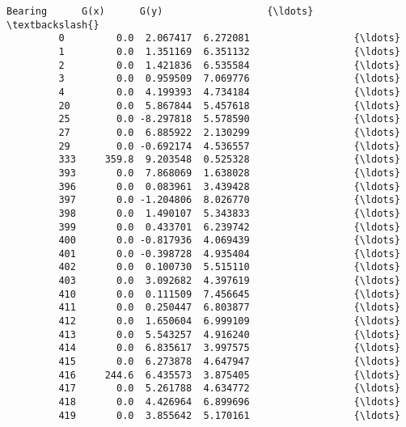 \documentclass[11pt]{article}
\begin{document}
\begin{Verbatim}[commandchars=\\\{\}]
               Bearing      G(x)      G(y)                  {\ldots}                   \textbackslash{}
         0         0.0  2.067417  6.272081                  {\ldots}                    
         1         0.0  1.351169  6.351132                  {\ldots}                    
         2         0.0  1.421836  6.535584                  {\ldots}                    
         3         0.0  0.959509  7.069776                  {\ldots}                    
         4         0.0  4.199393  4.734184                  {\ldots}                    
         20        0.0  5.867844  5.457618                  {\ldots}                    
         25        0.0 -8.297818  5.578590                  {\ldots}                    
         27        0.0  6.885922  2.130299                  {\ldots}                    
         29        0.0 -0.692174  4.536557                  {\ldots}                    
         333     359.8  9.203548  0.525328                  {\ldots}                    
         393       0.0  7.868069  1.638028                  {\ldots}                    
         396       0.0  0.083961  3.439428                  {\ldots}                    
         397       0.0 -1.204806  8.026770                  {\ldots}                    
         398       0.0  1.490107  5.343833                  {\ldots}                    
         399       0.0  0.433701  6.239742                  {\ldots}                    
         400       0.0 -0.817936  4.069439                  {\ldots}                    
         401       0.0 -0.398728  4.935404                  {\ldots}                    
         402       0.0  0.100730  5.515110                  {\ldots}                    
         403       0.0  3.092682  4.397619                  {\ldots}                    
         410       0.0  0.111509  7.456645                  {\ldots}                    
         411       0.0  0.250447  6.803877                  {\ldots}                    
         412       0.0  1.650604  6.999109                  {\ldots}                    
         413       0.0  5.543257  4.916240                  {\ldots}                    
         414       0.0  6.835617  3.997575                  {\ldots}                    
         415       0.0  6.273878  4.647947                  {\ldots}                    
         416     244.6  6.435573  3.875405                  {\ldots}                    
         417       0.0  5.261788  4.634772                  {\ldots}                    
         418       0.0  4.426964  6.899696                  {\ldots}                    
         419       0.0  3.855642  5.170161                  {\ldots}                    

\end{Verbatim}
\end{document}
